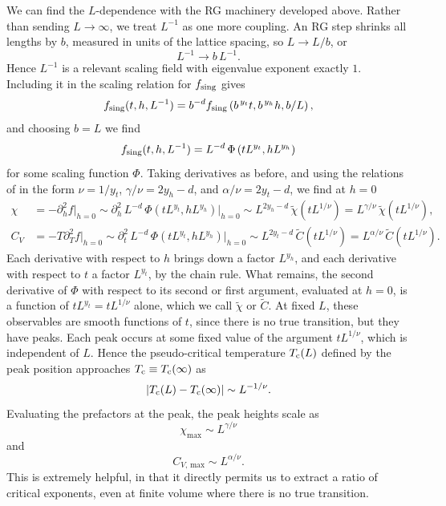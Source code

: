 We can find the $L$-dependence with the RG machinery developed above. Rather
than sending $L\to\infty$, we treat $L^{-1}$ as one more coupling. An RG step
shrinks all lengths by $b$, measured in units of the lattice spacing, so
$L\to L/b$, or
\begin{equation}
  L^{-1}\to b\,L^{-1}.
\end{equation}
Hence $L^{-1}$ is a relevant scaling field with eigenvalue exponent exactly $1$.
Including it in the scaling relation for $f_{\text{sing}}$ gives
\begin{equation}
  f_{\text{sing}}(t,h,L^{-1})=b^{-d}f_{\text{sing}}\left(b^{\,y_t}t,b^{\,y_h}h,b/L\right),
\end{equation}
and choosing $b=L$ we find
\begin{equation}
  f_{\text{sing}}(t,h,L^{-1})=L^{-d}\,\Phi\left(tL^{y_t},hL^{y_h}\right)
\end{equation}
for some scaling function $\Phi$. Taking derivatives
as before, and using the relations of  in the form
$\nu=1/y_t$, $\gamma/\nu=2y_h-d$, and $\alpha/\nu=2y_t-d$, we find at $h=0$
\begin{equation}\begin{aligned}
  \chi&=-\partial_h^2 f\big|_{h=0}
     \sim\partial_h^2\,L^{-d}\,\Phi\left(tL^{y_t},hL^{y_h}\right)\big|_{h=0}
     \sim L^{2y_h-d}\,\tilde{\chi}\left(tL^{1/\nu}\right)
     =L^{\gamma/\nu}\,\tilde{\chi}\left(tL^{1/\nu}\right),\\
  C_V&=-T\partial_T^2 f\big|_{h=0}
     \sim\partial_t^2\,L^{-d}\,\Phi\left(tL^{y_t},hL^{y_h}\right)\big|_{h=0}
     \sim L^{2y_t-d}\,\tilde{C}\left(tL^{1/\nu}\right)
     =L^{\alpha/\nu}\,\tilde{C}\left(tL^{1/\nu}\right).
\end{aligned}\end{equation}
Each derivative with respect to $h$ brings down a factor $L^{y_h}$, and each
derivative with respect to $t$ a factor $L^{y_t}$, by the chain rule. What
remains, the second derivative of $\Phi$ with respect to its second or first
argument, evaluated at $h=0$, is a function of $tL^{y_t}=tL^{1/\nu}$ alone,
which we call $\tilde{\chi}$ or $\tilde{C}$. At fixed $L$, these
observables are smooth functions of $t$, since there is no true transition, but
they have peaks. Each peak occurs at some fixed value of the argument
$tL^{1/\nu}$, which is independent of $L$. Hence the pseudo-critical temperature
$T_{\rm c}(L)$ defined by the peak position approaches $T_{\rm c}\equiv T_{\rm c}(\infty)$ as
\begin{equation}\label{eq:fssnu}
    |T_{\rm c}(L)-T_{\rm c}(\infty)|\sim L^{-1/\nu}.
\end{equation}
Evaluating the prefactors at the peak, the peak heights scale as
\begin{equation}\label{eq:fss_susc_2nd}
    \chi_{\text{max}}\sim L^{\gamma/\nu}
\end{equation}
and
\begin{equation}\label{eq:fss_CV}
    C_{V,\,\text{max}}\sim L^{\alpha/\nu}.
\end{equation}
This is extremely helpful, in that it directly permits us to extract a ratio of
critical exponents, even at finite volume where there is no true transition.

